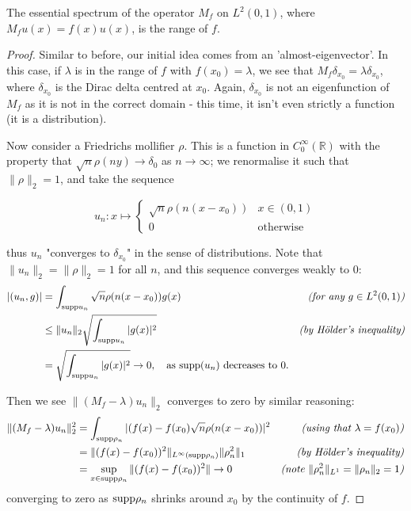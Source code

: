 \documentclass[../main.tex]{subfiles}
\begin{document}
\begin{proposition}
The essential spectrum of the operator $M_f$ on $L^2(0, 1)$, where $M_f u(x) = f(x)u(x)$, is the range of $f$.
\end{proposition}
\begin{proof}
Similar to before, our initial idea comes from an 'almost-eigenvector'. In this case, if $\lambda$ is in the range
of $f$ with $f(x_0) = \lambda$, we see that $M_f \delta_{x_0} = \lambda \delta_{x_0}$, where $\delta_{x_0}$ is the
Dirac delta centred at $x_0$. Again, $\delta_{x_0}$ is not an eigenfunction of $M_f$ as it is not in the correct domain - this time, 
it isn't even strictly a function (it is a distribution).

Now consider a Friedrichs mollifier $\rho$. This is a function in $C^\infty_0(\mathbb{R})$ with the property that $\sqrt{n}\rho(ny) \rightarrow \delta_0$ as $n \rightarrow \infty$; we renormalise it such that $\|\rho\|_2 = 1$, and take the sequence 

$$u_n: x \mapsto 
\begin{cases}
  \sqrt{n}\rho(n(x-x_0)) & x \in (0, 1) \\
  0 & \text{otherwise}
\end{cases}
$$

thus $u_n$ "converges to $\delta_{x_0}$" in the sense of distributions. Note that $\|u_n\|_2 = \|\rho\|_2 = 1$ for all $n$, and this sequence converges weakly to 0:
\begin{align*}
|( u_n, g )| & = \int_{\mathrm{supp}{u_n}}\sqrt{n}\rho(n(x-x_0))g(x) & \text{\emph{(for any $g \in L^2(0, 1)$)}} \\
& \leq \|u_n\|_2 \sqrt{\int_{\mathrm{supp}{u_n}} |g(x)|^2} & \text{\emph{(by H\"older's inequality)}} \\
& = \sqrt{\int_{\mathrm{supp}{u_n}} |g(x)|^2} \rightarrow 0, \quad \text{as $\mathrm{supp}(u_n)$ decreases to 0.} &
\end{align*}

Then we see $\|(M_f - \lambda)u_n\|_2$ converges to zero by similar reasoning:
\begin{align*}
\|(M_f - \lambda)u_n\|^2_2 & = \int_{\mathrm{supp} \rho_n} |(f(x) - f(x_0) \sqrt{n} \rho(n(x-x_0))|^2 & \text{\emph{(using that $\lambda = f(x_0)$)}} \\
& = \|(f(x) - f(x_0))^2\|_{L^\infty (\mathrm{supp} \rho_n)} \|\rho_n^2\|_1 & \text{\emph{(by H\"older's inequality)}} \\
& = \sup_{x \in \mathrm{supp} \rho_n} \|(f(x) - f(x_0))^2\| \rightarrow 0 & \text{\emph{(note $\|\rho_n^2\|_{L^1} = \|\rho_n\|_2 = 1$)}} \\
\end{align*}
converging to zero as $\mathrm{supp} \rho_n$ shrinks around $x_0$ by the continuity of $f$.

\end{proof}
\end{document}
